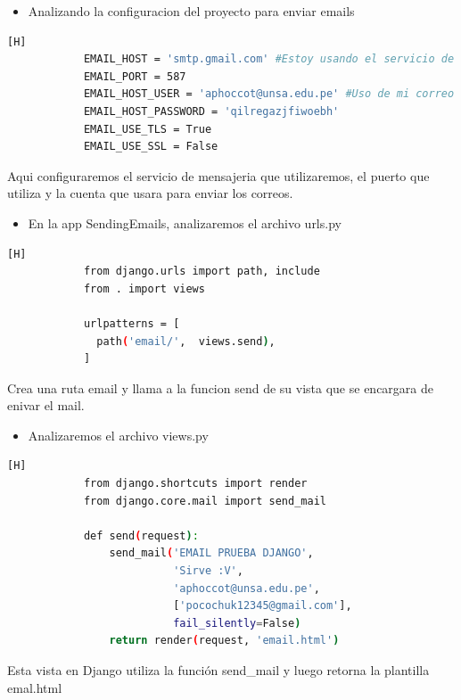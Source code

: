 \documentclass{article}
\begin{document}
        \begin{itemize}
            \item Analizando la configuracion del proyecto para enviar emails
        \end{itemize}
        \begin{lstlisting}[language=bash,caption={Archivo settings.py}][H]
            EMAIL_HOST = 'smtp.gmail.com' #Estoy usando el servicio de gmail
            EMAIL_PORT = 587
            EMAIL_HOST_USER = 'aphoccot@unsa.edu.pe' #Uso de mi correo institucional
            EMAIL_HOST_PASSWORD = 'qilregazjfiwoebh'
            EMAIL_USE_TLS = True
            EMAIL_USE_SSL = False
	\end{lstlisting}
        Aqui configuraremos el servicio de mensajeria que utilizaremos, el puerto que utiliza y la cuenta que usara para enviar los correos.
        \newline
        
         \begin{itemize}
            \item En la app SendingEmails, analizaremos el archivo urls.py
        \end{itemize}
        \begin{lstlisting}[language=bash,caption={Archivo SendingEmails/urls.py}][H]
            from django.urls import path, include
            from . import views
            
            urlpatterns = [
              path('email/',  views.send),
            ]

	\end{lstlisting}
        Crea una ruta email y llama a la funcion send de su vista que se encargara de enivar el mail.\newline

        \begin{itemize}
            \item Analizaremos el archivo views.py
        \end{itemize}
        \begin{lstlisting}[language=bash,caption={Archivo SendingEmails/views.py}][H]
            from django.shortcuts import render
            from django.core.mail import send_mail
            
            def send(request):
                send_mail('EMAIL PRUEBA DJANGO',
                          'Sirve :V',
                          'aphoccot@unsa.edu.pe',
                          ['pocochuk12345@gmail.com'],
                          fail_silently=False)
                return render(request, 'email.html')
	\end{lstlisting}
         Esta vista en Django utiliza la función send\_mail y luego retorna la plantilla emal.html\newline
\end{document}
